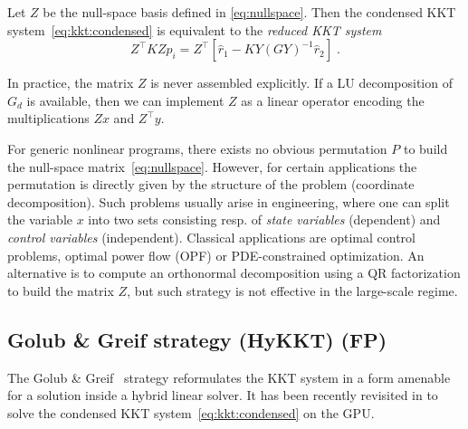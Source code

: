 \begin{proposition}[Reduction]
  Let $Z$ be the null-space basis defined in \eqref{eq:nullspace}.
  Then the condensed KKT system~\eqref{eq:kkt:condensed}
  is equivalent to the \emph{reduced KKT system}
  \begin{equation}
    Z^\top K Z p_i =
    Z^\top [\hat{r}_1 - K Y (GY)^{-1} \hat{r}_2] \; .
  \end{equation}
\end{proposition}

In practice, the matrix $Z$ is never assembled explicitly.
If a LU decomposition of $G_d$ is available, then we can
implement $Z$ as a linear operator encoding the multiplications
$Z x$ and $Z^\top y$.

For generic nonlinear programs,
there exists no obvious permutation $P$ to build the null-space
matrix~\eqref{eq:nullspace}. However, for certain applications the
permutation is directly given by the structure of the problem
(coordinate decomposition).
Such problems usually arise in engineering, where one can split
the variable $x$ into two sets consisting resp. of \emph{state variables} (dependent)
and \emph{control variables} (independent). Classical applications
are optimal control problems, optimal power flow (OPF) or PDE-constrained optimization.
An alternative is to compute an orthonormal decomposition using a QR factorization
to build the matrix $Z$, but such strategy is not effective in the
large-scale regime.



\subsection{Golub \& Greif strategy (HyKKT) (FP)}
The Golub \& Greif~\cite{golub2003solving} strategy reformulates the KKT system
in a form amenable for a solution inside a hybrid linear solver.
It has been recently revisited in \cite{regev2023hykkt}
to solve the condensed KKT system~\eqref{eq:kkt:condensed} on the GPU.

